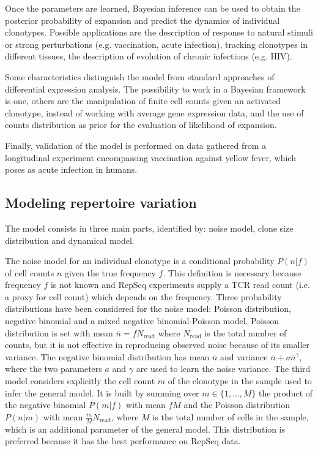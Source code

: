 \documentclass[a4paper,twocolumn]{article}
\begin{document}
Once the parameters are learned, Bayesian inference can be used to obtain the posterior probability of expansion and predict the dynamics of individual clonotypes.
Possible applications are the description of response to natural stimuli or strong perturbations (e.g. vaccination, acute infection), tracking clonotypes in different tissues, the description of evolution of chronic infections (e.g. HIV).

Some characteristics distinguish the model from standard approaches of differential expression analysis. The possibility to work in a Bayesian framework is one, others are the manipulation of finite cell counts given an activated clonotype, instead of working with average gene expression data, and the use of counts distribution as prior for the evaluation of likelihood of expansion.

Finally, validation of the model is performed on data gathered from a longitudinal experiment encompassing vaccination against yellow fever, which poses as acute infection in humans.

\subsection{Modeling repertoire variation}
The model consists in three main parts, identified by: noise model, clone size distribution and dynamical model.

The noise model for an individual clonotype is a conditional probability $P(n|f)$ of cell counts $n$ given the true frequency $f$. This definition is necessary because frequency $f$ is not known and RepSeq experiments supply a TCR read count (i.e. a proxy for cell count) which depends on the frequency.
Three probability distributions have been considered for the noise model: Poisson distribution, negative binomial and a mixed negative binomial-Poisson model. Poisson distribution is set with mean $\bar{n} = f N_\mathrm{read}$ where $N_\mathrm{read}$ is the total number of counts, but it is not effective in reproducing observed noise because of its smaller variance. The negative binomial distribution has mean $\bar{n}$ and variance $\bar{n} + a \bar{n}^\gamma$, where the two parameters $a$ and $\gamma$ are used to learn the noise variance. The third model considers explicitly the cell count $m$ of the clonotype in the sample used to infer the general model. It is built by summing over $m \in \{1, \dots, M\}$ the product of the negative binomial $P(m|f)$ with mean $f M$ and the Poisson distribution $P(n|m)$ with mean $\frac{m}{M} N_\mathrm{read}$, where $M$ is the total number of cells in the sample, which is an additional parameter of the general model. This distribution is preferred because it has the best performance on RepSeq data.
\end{document}
